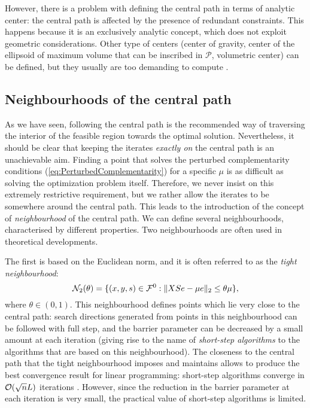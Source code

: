 However, there is a problem with defining the central path in terms
of analytic center: the central path is affected by the presence of 
redundant constraints. 
This happens because it is an exclusively analytic concept, which does
not exploit geometric considerations.
Other type of centers (center of gravity, center of the ellipsoid of 
maximum volume that can be inscribed in $\mathcal{P}$, volumetric center) 
can be defined, but they usually are too demanding to compute 
\cite{Gonzaga92}. 


%
%
\subsection{Neighbourhoods of the central path}
\label{sec:Neighbourhoods}

As we have seen, following the central path is the recommended
way of traversing the interior of the feasible region towards
the optimal solution. Nevertheless, it should be clear that keeping the
iterates {\em exactly on} the central path is an unachievable aim.
Finding a point that solves the perturbed complementarity conditions 
(\ref{eq:PerturbedComplementarity}) for a specific $\mu$ 
is as difficult as solving the optimization problem itself.
%
Therefore, we never insist on this extremely restrictive requirement,
but we rather allow the iterates to be somewhere around the central path.
This leads to the introduction of the concept of
{\em neighbourhood} of the central path. 
We can define several neighbourhoods, characterised
by different properties.
Two neighbourhoods are often used in theoretical developments.

The first is based on the Euclidean norm, and it is often referred
to as the {\em tight neighbourhood}:
\[
\mathcal{N}_2(\theta) = \{ (x,y,s) \in \mathcal{F}^0 :
                         \| XSe - \mu e \|_2 \le \theta\mu \},
\]
where $\theta \in (0,1)$.
This neighbourhood defines points which lie very close to the central path:
search directions generated from points in this neighbourhood can be 
followed with full step, and the barrier parameter can be decreased
by a small amount at each iteration (giving rise to the name
of {\em short-step algorithms} to the algorithms that are based on
this neighbourhood). 
The closeness to the central path that the tight neighbourhood
imposes and maintains allows to produce the best convergence result
for linear programming: short-step algorithms converge in 
$\mathcal{O}(\sqrt{n}L)$ iterations \cite{KojimaMizunoYoshise89b,MonteiroAdler89a}.
However, since the reduction in the barrier parameter at each iteration 
is very small, the practical value of short-step algorithms is limited.

